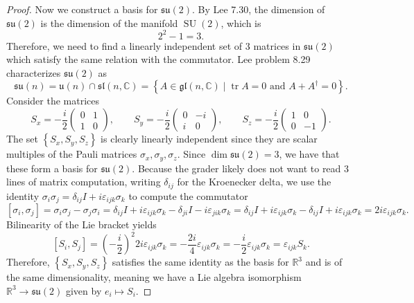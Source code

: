\documentclass[11pt, letterpaper]{article}
\begin{document}
\begin{proof}
	Now we construct a basis for $\mathfrak{su} (2)$. By Lee 7.30, the dimension of $\mathfrak{su} (2)$ is the dimension of the manifold $\operatorname{SU} (2)$, which is
	\[
		2^2-1=3
	.\]
	Therefore, we need to find a linearly independent set of 3 matrices in $\mathfrak{su} (2)$ which satisfy the same relation with the commutator. Lee problem 8.29 characterizes $\mathfrak{su} (2)$ as
	\[
		\mathfrak{su} (n) = \mathfrak{u} (n) \cap \mathfrak{sl} (n,\mathbb{C} ) = \left\{ A\in \mathfrak{gl} (n,\mathbb{C} )\mid \operatorname{tr} A=0\text{ and } A+A^\dagger=0 \right\} 
	.\]
	Consider the matrices
	\[
		S_x = -\frac{i}{2} \begin{pmatrix}
		0 & 1 \\
		1 & 0
		\end{pmatrix},\qquad S_y = -\frac{i}{2} \begin{pmatrix}
		0 & -i \\
		i & 0
		\end{pmatrix},\qquad S_z = -\frac{i}{2} \begin{pmatrix}
		1 & 0 \\
		0 & -1
		\end{pmatrix}
	.\]
	The set $\left\{ S_x,S_y,S_z \right\} $ is clearly linearly independent since they are scalar multiples of the Pauli matrices $\sigma _x,\sigma _y,\sigma _z$. Since $\dim \mathfrak{su} (2)=3$, we have that these form a basis for $\mathfrak{su} (2)$. Because the grader likely does not want to read 3 lines of matrix computation, writing $\delta _{ij} $ for the Kroenecker delta, we use the identity $\sigma_i\sigma _j=\delta_{ij} I+i\varepsilon _{ijk} \sigma _k$ to compute the commutator
	\[
		[\sigma _i,\sigma _j]=\sigma _i\sigma _j-\sigma _j\sigma _i=\delta _{ij} I+i\varepsilon _{ijk} \sigma _k - \delta _{ji} I - i\varepsilon _{jik} \sigma _k= \delta _{ij} I+i\varepsilon _{ijk} \sigma _k - \delta _{ij} I + i\varepsilon _{ijk} \sigma _k = 2i\varepsilon _{ijk} \sigma _k
	.\]
	Bilinearity of the Lie bracket yields
	\[
		[S_i,S_j]=\left( -\frac{i}{2}  \right) ^2 2i\varepsilon_{ijk} \sigma_k=-\frac{2i}{4} \varepsilon _{ijk} \sigma _k = -\frac{i}{2} \varepsilon _{ijk} \sigma _k = \varepsilon _{ijk} S_k
	.\]
	Therefore, $\left\{ S_x,S_y,S_z \right\} $ satisfies the same identity as the basis for $\mathbb{R} ^3$ and is of the same dimensionality, meaning we have a Lie algebra isomorphism $\mathbb{R} ^3 \to \mathfrak{su} (2)$ given by $e_i\mapsto S_i$.
\end{proof}
\end{document}
